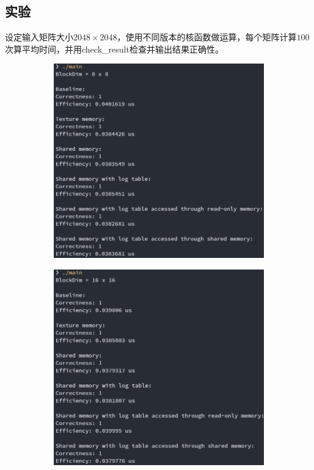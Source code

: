 \documentclass[UTF8, a4paper, 11pt]{article}
\begin{document}
\subsection{实验}
设定输入矩阵大小$2048\times2048$，使用不同版本的核函数做运算，每个矩阵计算$100$次算平均时间，并用check\_result检查并输出结果正确性。
\begin{figure}[H]
\begin{center}
\begin{subfigure}[b]{0.48\linewidth}
    \includegraphics[width=\textwidth]{8.png}
\end{subfigure}
\begin{subfigure}[b]{0.48\linewidth}
    \includegraphics[width=\textwidth]{16.png}

\end{subfigure}
\end{center}
\end{figure}
\end{document}

